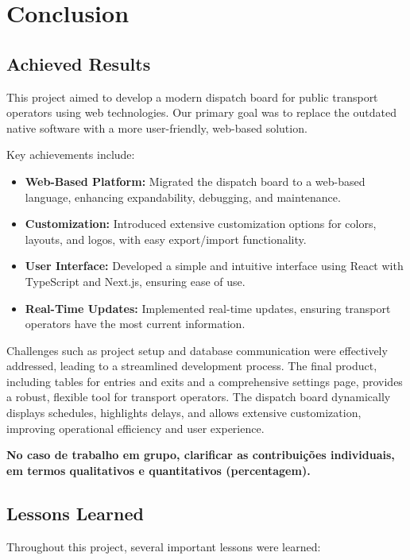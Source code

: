 \documentclass[10pt]{article}
\begin{document}
        \section{Conclusion}


        \subsection{Achieved Results}
        This project aimed to develop a modern dispatch board for public transport operators using web technologies. Our primary goal was to replace the outdated native software with a more user-friendly, web-based solution. 

        Key achievements include:

        \begin{itemize}
            \item \textbf{Web-Based Platform:} Migrated the dispatch board to a web-based language, enhancing expandability, debugging, and maintenance.
            \item \textbf{Customization:} Introduced extensive customization options for colors, layouts, and logos, with easy export/import functionality.
            \item \textbf{User Interface:} Developed a simple and intuitive interface using React with TypeScript and Next.js, ensuring ease of use.
            \item \textbf{Real-Time Updates:} Implemented real-time updates, ensuring transport operators have the most current information.
        \end{itemize}

        Challenges such as project setup and database communication were effectively addressed, leading to a streamlined development process. The final product, including tables for entries and exits and a comprehensive settings page, provides a robust, flexible tool for transport operators. The dispatch board dynamically displays schedules, highlights delays, and allows extensive customization, improving operational efficiency and user experience.


        \textbf{No caso de trabalho em grupo, clarificar as contribuições individuais, em termos qualitativos e quantitativos (percentagem).}
         \subsection{Lessons Learned}

         Throughout this project, several important lessons were learned:
\end{document}
